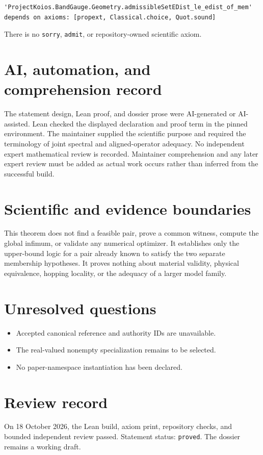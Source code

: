 \documentclass[11pt]{article}
\begin{document}
\begin{lstlisting}
'ProjectKoios.BandGauge.Geometry.admissibleSetEDist_le_edist_of_mem'
depends on axioms: [propext, Classical.choice, Quot.sound]
\end{lstlisting}

There is no \texttt{sorry}, \texttt{admit}, or repository-owned scientific axiom.

\section{AI, automation, and comprehension record}

The statement design, Lean proof, and dossier prose were AI-generated or AI-assisted.
Lean checked the displayed declaration and proof term in the pinned environment. The
maintainer supplied the scientific purpose and required the terminology of joint
spectral and aligned-operator adequacy. No independent expert mathematical review is
recorded. Maintainer comprehension and any later expert review must be added as actual
work occurs rather than inferred from the successful build.

\section{Scientific and evidence boundaries}

This theorem does not find a feasible pair, prove a common witness, compute the global
infimum, or validate any numerical optimizer. It establishes only the upper-bound logic
for a pair already known to satisfy the two separate membership hypotheses. It proves
nothing about material validity, physical equivalence, hopping locality, or the adequacy
of a larger model family.

\section{Unresolved questions}

\begin{itemize}
 \item Accepted canonical reference and authority IDs are unavailable.
 \item The real-valued nonempty specialization remains to be selected.
 \item No paper-namespace instantiation has been declared.
\end{itemize}

\section{Review record}

On 18 October 2026, the Lean build, axiom print, repository checks, and bounded independent
review passed. Statement status: \texttt{proved}. The dossier remains a working draft.
\end{document}
